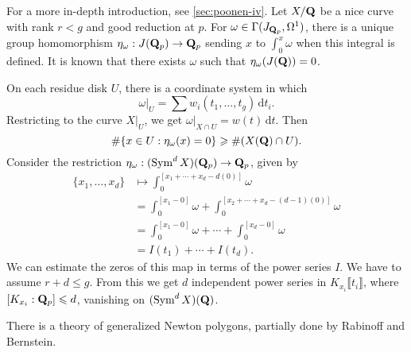 For a more in-depth introduction, see \autoref{sec:poonen-iv}. Let $X/\mathbf{Q}$ be 
a nice curve with rank $r<g$ and good reduction at $p$. For 
$\omega\in \Gamma(J_{\mathbf{Q}_p},\Omega^1)$, there is a unique group homomorphism 
$\eta_\omega:J(\mathbf{Q}_p) \to \mathbf{Q}_p$ sending $x$ to $\int_0^x\omega$ when this 
integral is defined. It is known that there exists $\omega$ such that 
$\eta_\omega(J(\mathbf{Q}))=0$. 

On each residue disk $U$, there is a coordinate system in which 
\[
  \omega|_U = \sum w_i(t_1,\dots,t_g)\, \mathrm{d} t_i .
\]
Restricting to the curve $X|_U$, we get 
$\omega|_{X\cap U} = w(t)\, \mathrm{d}t$. Then 
\[
  \#\{x\in U:\eta_\omega(x)=0\} \geqslant \#(X(\mathbf{Q})\cap U) .
\]
Consider the restriction $\eta_\omega:(\operatorname{Sym}^d X)(\mathbf{Q}_p) \to \mathbf{Q}_p$, 
given by 
\begin{align*}
  \{x_1,\dots,x_d\} 
    &\mapsto \int_0^{[x_1+\cdots + x_d-d(0)]} \omega \\
    &= \int_0^{[x_1-0]} \omega + \int_0^{[x_2 + \cdots + x_d-(d-1)(0)]}\omega \\
    &= \int_0^{[x_1-0]}\omega + \cdots + \int_0^{[x_d-0]}\omega \\
    &= I(t_1) + \cdots + I(t_d) .
\end{align*}
We can estimate the zeros of this map in terms of the power series $I$. We have 
to assume $r+d\leqslant g$. From this we get $d$ independent power series in 
$K_{x_i}\llbracket t_i\rrbracket$, where $[K_{x_i}:\mathbf{Q}_p]\leqslant d$, 
vanishing on $(\operatorname{Sym}^d X)(\mathbf{Q})$. 

There is a theory of generalized Newton polygons, partially done by Rabinoff 
and Bernstein. 




